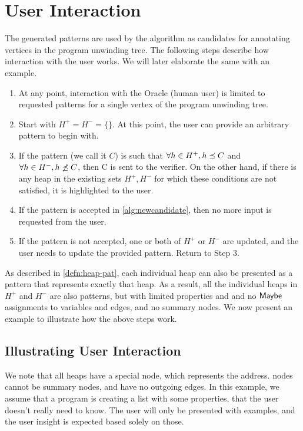 \section{User Interaction}
The generated patterns are used by the \verifier algorithm as candidates for annotating vertices in the program unwinding tree. The following steps describe how interaction with the user works. We will later elaborate the same with an example.

\begin{enumerate}
  \item At any point, interaction with the Oracle (human user) is limited to requested patterns for a single vertex of the program unwinding tree.
  \item Start with $H^{+} = H^{-} = \{\}$. At this point, the user can provide an arbitrary pattern to begin with.
  \item If the pattern (we call it $C$) is such that $\forall h \in H^{+}, h \preceq C$ and $\forall h \in H^{-}, h \not \preceq C$, then C is sent to the verifier. On the other hand, if there is any heap in the existing sets $H^{+}, H^{-}$ for which these conditions are not satisfied, it is highlighted to the user.
  \item If the pattern is accepted in \autoref{alg:newcandidate}, then no more input is requested from the user.
  \item If the pattern is not accepted, one or both of $H^{+}$ or $H^{-}$ are updated, and the user needs to update the provided pattern. Return to Step 3.
\end{enumerate}

As described in \autoref{defn:heap-pat}, each individual heap can also be presented as a pattern that represents exactly that heap. As a result, all the individual heaps in $H^{+}$ and $H^{-}$ are also patterns, but with limited properties and and no $\mathsf{Maybe}$ assignments to variables and edges, and no summary nodes. We now present an example to illustrate how the above steps work.

\subsection{Illustrating User Interaction}
We note that all heaps have a special \nilconst node, which represents the \nullconst address. \nilconst nodes cannot be summary nodes, and have no outgoing edges. In this example, we assume that a program is creating a list with some properties, that the user doesn't really need to know. The user will only be presented with examples, and the user insight is expected based solely on those.

